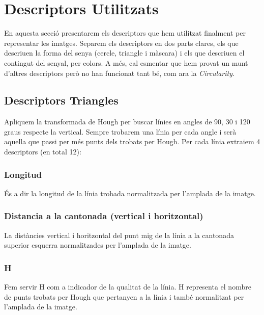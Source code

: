 

\section{Descriptors Utilitzats}%
\label{sec:desc}

En aquesta secció presentarem els descriptors que hem utilitzat finalment per
representar les imatges. Separem els descriptors en dos parts clares, els que descriuen
la forma del senya (cercle, triangle i màscara) i els que descriuen el contingut del
senyal, per colors.
A més, cal esmentar que hem provat un
munt d'altres descriptors però no han funcionat tant bé, com ara la \emph{Circularity}.


\subsection{Descriptors Triangles}

Apliquem la transformada de Hough per buscar línies en angles de 90, 30 i 120 graus respecte la vertical. Sempre trobarem una línia per cada angle i serà aquella que passi 
per més punts dels trobats per Hough. 
Per cada línia extraiem 4 descriptors (en total 12):

\subsubsection{Longitud}

És a dir la longitud de la línia trobada normalitzada per l'amplada de la imatge.

\subsubsection{Distancia a la cantonada (vertical i horitzontal)}

La distàncies vertical i horitzontal del punt mig de la línia a la cantonada 
superior esquerra normalitzades per l'amplada de la imatge.

\subsubsection{H}

Fem servir H com a indicador de la qualitat de la línia. H representa el nombre de
punts trobats per Hough que pertanyen a la línia i també normalitzat per l'amplada 
de la imatge.

